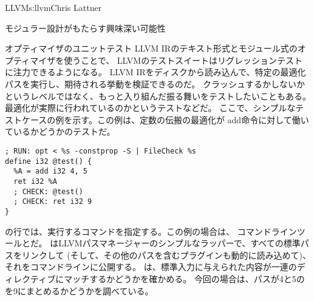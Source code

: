 \begin{aosachapter}{LLVM}{s:llvm}{Chris Lattner}
\begin{aosasect1}{モジュラー設計がもたらす興味深い可能性}
\begin{aosasect2}{オプティマイザのユニットテスト}
LLVM IRのテキスト形式とモジュール式のオプティマイザを使うことで、
LLVMのテストスイートはリグレッションテストに注力できるようになる。
LLVM IRをディスクから読み込んで、特定の最適化パスを実行し、期待される挙動を検証できるのだ。
クラッシュするかしないかというレベルではなく、もっと入り組んだ振る舞いをテストしたいこともある。
最適化が実際に行われているのかというテストなどだ。
ここで、シンプルなテストケースの例を示す。この例は、定数の伝搬の最適化が
add命令に対して働いているかどうかのテストだ。

\begin{verbatim}
; RUN: opt < %s -constprop -S | FileCheck %s
define i32 @test() {
  %A = add i32 4, 5
  ret i32 %A
  ; CHECK: @test()
  ; CHECK: ret i32 9
}
\end{verbatim}

\noindent
{}の行では、実行するコマンドを指定する。この例の場合は、
コマンドラインツールとだ。
はLLVMパスマネージャーのシンプルなラッパーで、すべての標準パスをリンクして
(そして、その他のパスを含むプラグインも動的に読み込めて)、それをコマンドラインに公開する。
は、標準入力に与えられた内容が一連のディレクティブにマッチするかどうかを確かめる。
今回の場合は、パスが4と5のを9にまとめるかどうかを調べている。


\end{aosasect2}
\end{aosasect1}
\end{aosachapter}
